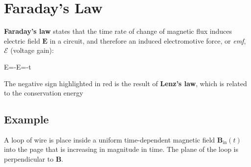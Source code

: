 \section{Faraday's Law}
\textbf{Faraday's law} states that the time rate of change of magnetic flux
induces electric field $\bm E$ in a circuit, and therefore an
induced electromotive force, or \emph{emf}, $\mathcal E$ (voltage gain):
\begin{important-equation}
  \mathcal E=-\oint\bm E\cdot\dl{\bm\ell}={\color{red}-}t
\end{important-equation}
The negative sign {\color{red}highlighted in red} is the result of
\textbf{Lenz's law}, which is related to the conservation energy



\subsection{Example}
A loop of wire is place inside a uniform time-dependent magnetic field
$\bm B_\text{in}(t)$ into the page that is increasing in magnitude in time.
The plane of the loop is perpendicular to $\bm B$.
